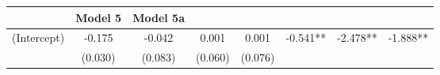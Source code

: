 \documentclass[12pt,twoside]{reedthesis}
\begin{document}
\begin{longtable}[]{@{}lccccccc@{}}
\begin{minipage}[b]{0.10\columnwidth}
  \end{minipage} & \begin{minipage}[b]{0.10\columnwidth}\centering\strut
  Model 5\strut
  \end{minipage} & \begin{minipage}[b]{0.10\columnwidth}\centering\strut
  Model 5a\strut
  \end{minipage}\tabularnewline
  \midrule
  \endhead
  \begin{minipage}[t]{0.12\columnwidth}\raggedright\strut
  (Intercept)\strut
  \end{minipage} & \begin{minipage}[t]{0.09\columnwidth}\centering\strut
  -0.175\strut
  \end{minipage} & \begin{minipage}[t]{0.10\columnwidth}\centering\strut
  -0.042\strut
  \end{minipage} & \begin{minipage}[t]{0.10\columnwidth}\centering\strut
  0.001\strut
  \end{minipage} & \begin{minipage}[t]{0.10\columnwidth}\centering\strut
  0.001\strut
  \end{minipage} & \begin{minipage}[t]{0.10\columnwidth}\centering\strut
  -0.541**\strut
  \end{minipage} & \begin{minipage}[t]{0.10\columnwidth}\centering\strut
  -2.478**\strut
  \end{minipage} & \begin{minipage}[t]{0.10\columnwidth}\centering\strut
  -1.888**\strut
  \end{minipage}\tabularnewline
  \begin{minipage}[t]{0.12\columnwidth}\raggedright\strut
  \strut
  \end{minipage} & \begin{minipage}[t]{0.09\columnwidth}\centering\strut
  (0.030)\strut
  \end{minipage} & \begin{minipage}[t]{0.10\columnwidth}\centering\strut
  (0.083)\strut
  \end{minipage} & \begin{minipage}[t]{0.10\columnwidth}\centering\strut
  (0.060)\strut
  \end{minipage} & \begin{minipage}[t]{0.10\columnwidth}\centering\strut
  (0.076)\strut
  \end{minipage} & \begin{minipage}[t]{0.10\columnwidth}\centering\strut

\end{minipage}
\end{longtable}
\end{document}
